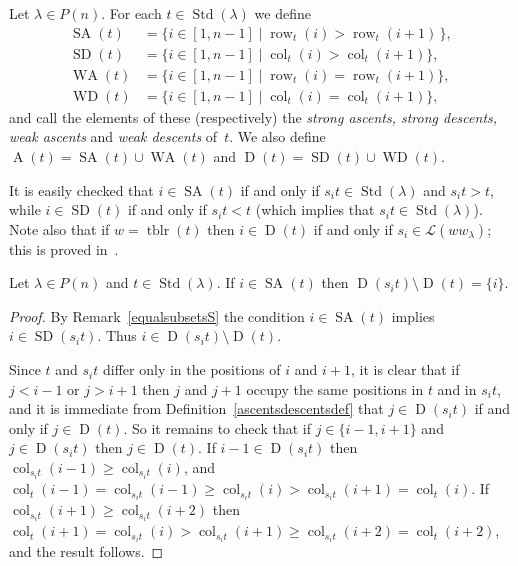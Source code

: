 \documentclass[ALCO,ThmDefs,Unicode,epreuves]{cedram}
\DeclareMathOperator{\perm}{tblr}
\DeclareMathOperator{\row}{row}
\DeclareMathOperator{\col}{col}
\DeclareMathOperator{\STD}{Std}
\DeclareMathOperator{\SD}{SD}
\DeclareMathOperator{\SA}{SA}
\DeclareMathOperator{\WD}{WD}
\DeclareMathOperator{\WA}{WA}
\DeclareMathOperator{\D}{D}
\DeclareMathOperator{\A}{A}
\begin{document}
\begin{defi}\label{ascentsdescentsdef}
Let $\lambda\in P(n)$. For each $t\in\STD(\lambda)$ we define
\begin{align*}
\SA(t) &= \{i\in[1,n-1] \mid \row_t(i) > \row_t(i+1)\,\},\\
\SD(t) &= \{i\in[1,n-1] \mid \col_t(i) > \col_t(i+1)\},\\
\WA(t) &= \{i\in[1,n-1] \mid \row_t(i)=\row_t(i+1)\},\\
\WD(t) &= \{i\in[1,n-1] \mid \col_t(i)=\col_t(i+1)\},
\end{align*}
and call the elements of these (respectively) the \emph{strong ascents, strong descents, weak ascents}
and \emph{weak descents} of~$t$.
We also define $\A(t)=\SA(t)\cup\WA(t)$ and
$\D(t)=\SD(t)\cup\WD(t)$.
\end{defi}
\begin{rema}\label{equalsubsetsS}
It is easily checked that
$i\in\SA(t)$ if and only if $s_it\in\STD(\lambda)$ and $s_it > t$,
while $i\in\SD(t)$ if and only if $s_it < t$ (which implies that
$s_it\in\STD(\lambda)$).
Note also that if $w=\perm(t)$ then $i\in\D(t)$ if
and only if $s_i\in \mathcal{L}(ww_{\lambda})$; this is proved
in~\cite[Lemma~5.2]{nguyen:wgideals2}.
\end{rema}

\begin{lemm}\label{dessjtminust}
Let $\lambda\in P(n)$ and $t\in\STD(\lambda)$. If $i\in\SA(t)$
then $\D(s_it)\setminus\D(t)=\{i\}$.
\end{lemm}

\begin{proof}
By Remark~\ref{equalsubsetsS} the condition $i\in\SA(t)$ implies
$i\in\SD(s_it)$. Thus $i\in\D(s_it)\setminus\D(t)$.

Since $t$ and $s_it$ differ only in the positions of $i$ and $i+1$, it
is clear that if $j<i-1$ or $j>i+1$ then $j$ and $j+1$ occupy the same
positions in $t$ and in $s_it$, and it is immediate from
Definition~\ref{ascentsdescentsdef} that $j\in\D(s_it)$ if and only
if $j\in\D(t)$. So it remains to check that if $j\in\{i-1,i+1\}$ and
$j\in\D(s_it)$ then $j\in\D(t)$. If $i-1\in\D(s_it)$ then
 $\col_{s_{i}t}(i-1)\geqslant\col_{s_{i}t}(i)$, and
$\col_t(i-1)=\col_{s_{i}t}(i-1)\geqslant\col_{s_{i}t}(i)>\col_{s_{i}t}(i+1)=\col_t(i)$.
If $\col_{s_{i}t}(i+1)\geqslant\col_{s_{i}t}(i+2)$ then
$\col_t(i+1)=\col_{s_{i}t}(i)>\col_{s_{i}t}(i+1)\geqslant\col_{s_{i}t}(i+2)=\col_t(i+2)$,
and the result follows.
\end{proof}
\end{document}

